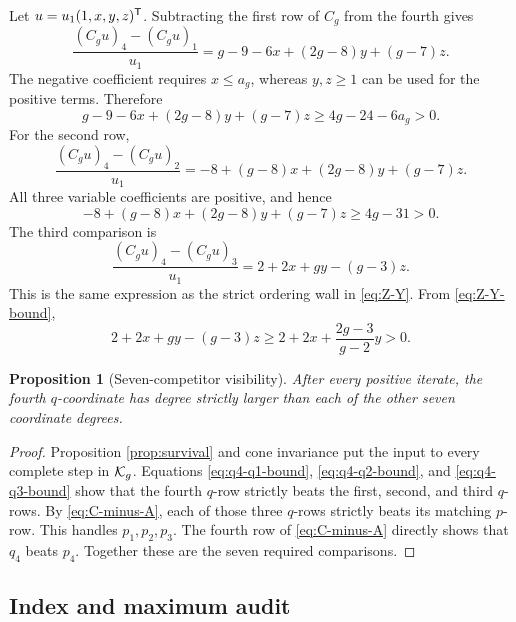 \documentclass[11pt]{article}
\newtheorem{proposition}[theorem]{Proposition}
\theoremstyle{remark}
\numberwithin{equation}{section}
\begin{document}
Let \(u=u_1(1,x,y,z)^{\mathsf{T}}\).  Subtracting the first row of \(C_g\)
from the fourth gives
\begin{equation}\label{eq:q4-q1}
\frac{(C_gu)_4-(C_gu)_1}{u_1}
=g-9-6x+(2g-8)y+(g-7)z.
\end{equation}
The negative coefficient requires \(x\leq a_g\), whereas
\(y,z\geq1\) can be used for the positive terms.  Therefore
\begin{equation}\label{eq:q4-q1-bound}
g-9-6x+(2g-8)y+(g-7)z
\geq4g-24-6a_g>0.
\end{equation}
For the second row,
\begin{equation}\label{eq:q4-q2}
\frac{(C_gu)_4-(C_gu)_2}{u_1}
=-8+(g-8)x+(2g-8)y+(g-7)z.
\end{equation}
All three variable coefficients are positive, and hence
\begin{equation}\label{eq:q4-q2-bound}
-8+(g-8)x+(2g-8)y+(g-7)z\geq4g-31>0.
\end{equation}
The third comparison is
\begin{equation}\label{eq:q4-q3}
\frac{(C_gu)_4-(C_gu)_3}{u_1}
=2+2x+gy-(g-3)z.
\end{equation}
This is the same expression as the strict ordering wall in
\eqref{eq:Z-Y}.  From \eqref{eq:Z-Y-bound},
\begin{equation}\label{eq:q4-q3-bound}
2+2x+gy-(g-3)z
\geq2+2x+\frac{2g-3}{g-2}y>0.
\end{equation}

\begin{proposition}[Seven-competitor visibility]\label{prop:visibility}
After every positive iterate, the fourth \(q\)-coordinate has degree
strictly larger than each of the other seven coordinate degrees.
\end{proposition}

\begin{proof}
Proposition \ref{prop:survival} and cone invariance put the input to every
complete step in \(\mathcal{K}_g\).  Equations
\eqref{eq:q4-q1-bound}, \eqref{eq:q4-q2-bound}, and
\eqref{eq:q4-q3-bound} show that the fourth \(q\)-row strictly beats the
first, second, and third \(q\)-rows.  By \eqref{eq:C-minus-A}, each of those
three \(q\)-rows strictly beats its matching \(p\)-row.  This handles
\(p_1,p_2,p_3\).  The fourth row of \eqref{eq:C-minus-A} directly shows
that \(q_4\) beats \(p_4\).  Together these are the seven required
comparisons.
\end{proof}

\subsection{Index and maximum audit}
\end{document}
